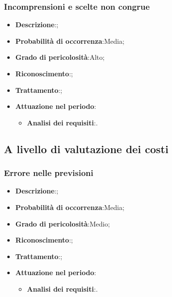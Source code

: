		\subsubsection{Incomprensioni e scelte non congrue}
		\begin{itemize}
			\item \textbf{Descrizione}:;
			\item \textbf{Probabilità di occorrenza}:Media;
			\item \textbf{Grado di pericolosità}:Alto;
			\item \textbf{Riconoscimento}:;	
			\item \textbf{Trattamento}:;
			\item \textbf{Attuazione nel periodo}:
			\begin{itemize}
				\item \textbf{Analisi dei requisiti}:.
			\end{itemize}
		\end{itemize}
	
	\subsection{A livello di valutazione dei costi}
	
		\subsubsection{Errore nelle previsioni}
		\begin{itemize} 
			\item \textbf{Descrizione}:;
			\item \textbf{Probabilità di occorrenza}:Media;
			\item \textbf{Grado di pericolosità}:Medio;
			\item \textbf{Riconoscimento}:;
			\item \textbf{Trattamento}:;
			\item \textbf{Attuazione nel periodo}:
			\begin{itemize}
				\item \textbf{Analisi dei requisiti}:.
			\end{itemize}
		\end{itemize}